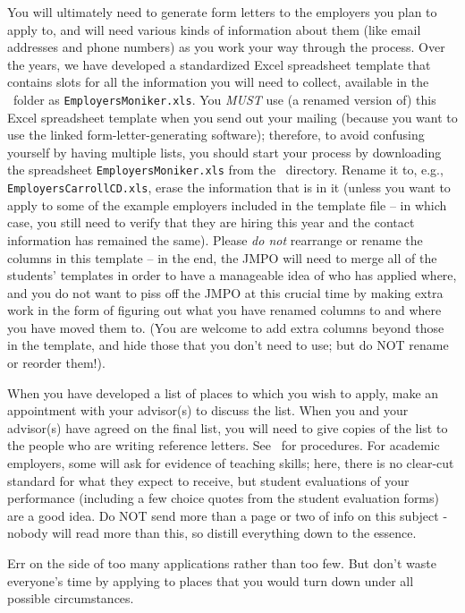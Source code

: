 \documentclass{\classes/econtex}
\begin{document}
You will ultimately need to generate form letters to the employers you
plan to apply to, and will need various kinds of information about
them (like email addresses and phone numbers) as you work your way
through the process.  Over the years, we have developed a standardized
Excel spreadsheet template that contains slots for all the information
you will need to collect, available in the \Templates~folder as
\texttt{EmployersMoniker.xls}.  You \textit{MUST} use (a renamed version
of) this Excel spreadsheet template when you send out your mailing
(because you want to use the linked form-letter-generating software);
therefore, to avoid confusing yourself by having multiple lists, you
should start your process by downloading the spreadsheet
\texttt{EmployersMoniker.xls} from the \Templates~directory.  Rename
it to, e.g., \texttt{EmployersCarrollCD.xls}, erase the information
that is in it (unless you want to apply to some of the example
employers included in the template file -- in which case, you still
need to verify that they are hiring this year and the contact
information has remained the same).  Please \textit{do not} rearrange or
rename the columns in this template -- in the end, the JMPO will need
to merge all of the students' templates in order to have a manageable
idea of who has applied where, and you do not want to piss off the
JMPO at this crucial time by making extra work in the form of figuring
out what you have renamed columns to and where you have moved them to.
(You are welcome to add extra columns beyond those in the template,
and hide those that you don't need to use; but do NOT rename or
reorder them!).

When you have developed a list of places to which you wish to apply, make an appointment with your advisor(s) to discuss the list.  When you and your advisor(s) have agreed on the final list, you will need to give copies of the list to the people who are writing reference letters.  See \recLet~for procedures. For academic employers, some will ask for evidence of teaching skills; here, there is no clear-cut standard for what they expect to receive, but student evaluations of your performance (including a few choice quotes from the student evaluation forms) are a good idea.  Do NOT send more than a page or two of info on this subject - nobody will read more than this, so distill everything down to the essence.

Err on the side of too many applications rather than too few.  But
don't waste everyone's time by applying to places that you would turn
down under all possible circumstances.
\end{document}
